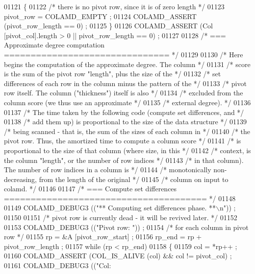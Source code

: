\begin{DoxyCode}
{{{{{{{{{{{{{{{{{{{{{{01121     \{
01122       \textcolor{comment}{/* there is no pivot row, since it is of zero length */}
01123       pivot\_row = COLAMD\_EMPTY ;
01124       COLAMD\_ASSERT (pivot\_row\_length == 0) ;
01125     \}
01126     COLAMD\_ASSERT (Col [pivot\_col].length > 0 || pivot\_row\_length == 0) ;
01127 
01128     \textcolor{comment}{/* === Approximate degree computation =============================== */}
01129 
01130     \textcolor{comment}{/* Here begins the computation of the approximate degree.  The column */}
01131     \textcolor{comment}{/* score is the sum of the pivot row "length", plus the size of the */}
01132     \textcolor{comment}{/* set differences of each row in the column minus the pattern of the */}
01133     \textcolor{comment}{/* pivot row itself.  The column ("thickness") itself is also */}
01134     \textcolor{comment}{/* excluded from the column score (we thus use an approximate */}
01135     \textcolor{comment}{/* external degree). */}
01136 
01137     \textcolor{comment}{/* The time taken by the following code (compute set differences, and */}
01138     \textcolor{comment}{/* add them up) is proportional to the size of the data structure */}
01139     \textcolor{comment}{/* being scanned - that is, the sum of the sizes of each column in */}
01140     \textcolor{comment}{/* the pivot row.  Thus, the amortized time to compute a column score */}
01141     \textcolor{comment}{/* is proportional to the size of that column (where size, in this */}
01142     \textcolor{comment}{/* context, is the column "length", or the number of row indices */}
01143     \textcolor{comment}{/* in that column).  The number of row indices in a column is */}
01144     \textcolor{comment}{/* monotonically non-decreasing, from the length of the original */}
01145     \textcolor{comment}{/* column on input to colamd. */}
01146 
01147     \textcolor{comment}{/* === Compute set differences ====================================== */}
01148 
01149     COLAMD\_DEBUG3 ((\textcolor{stringliteral}{"** Computing set differences phase. **\(\backslash\)n"})) ;
01150 
01151     \textcolor{comment}{/* pivot row is currently dead - it will be revived later. */}
01152 
01153     COLAMD\_DEBUG3 ((\textcolor{stringliteral}{"Pivot row: "})) ;
01154     \textcolor{comment}{/* for each column in pivot row */}
01155     rp = &A [pivot\_row\_start] ;
01156     rp\_end = rp + pivot\_row\_length ;
01157     \textcolor{keywordflow}{while} (rp < rp\_end)
01158     \{
01159       col = *rp++ ;
01160       COLAMD\_ASSERT (COL\_IS\_ALIVE (col) && col != pivot\_col) ;
01161       COLAMD\_DEBUG3 ((\textcolor{stringliteral}{"Col: %
}}}}}}}}}}}}}}}}}}}}}}}
\end{DoxyCode}
